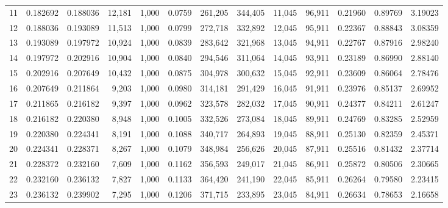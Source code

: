 \begin{tabular}{rrrrrrrrrrrrr}
11  &  0.182692 &  0.188036 &  12,181 &  1,000 &                                     0.0759 &  261,205 &  344,405 &   11,045 &   96,911 &  0.21960 &  0.89769 &  3.19023 \\
12  &  0.188036 &  0.193089 &  11,513 &  1,000 &                                     0.0799 &  272,718 &  332,892 &   12,045 &   95,911 &  0.22367 &  0.88843 &  3.08359 \\
13  &  0.193089 &  0.197972 &  10,924 &  1,000 &                                     0.0839 &  283,642 &  321,968 &   13,045 &   94,911 &  0.22767 &  0.87916 &  2.98240 \\
14  &  0.197972 &  0.202916 &  10,904 &  1,000 &                                     0.0840 &  294,546 &  311,064 &   14,045 &   93,911 &  0.23189 &  0.86990 &  2.88140 \\
15  &  0.202916 &  0.207649 &  10,432 &  1,000 &                                     0.0875 &  304,978 &  300,632 &   15,045 &   92,911 &  0.23609 &  0.86064 &  2.78476 \\
16  &  0.207649 &  0.211864 &   9,203 &  1,000 &                                     0.0980 &  314,181 &  291,429 &   16,045 &   91,911 &  0.23976 &  0.85137 &  2.69952 \\
17  &  0.211865 &  0.216182 &   9,397 &  1,000 &                                     0.0962 &  323,578 &  282,032 &   17,045 &   90,911 &  0.24377 &  0.84211 &  2.61247 \\
18  &  0.216182 &  0.220380 &   8,948 &  1,000 &                                     0.1005 &  332,526 &  273,084 &   18,045 &   89,911 &  0.24769 &  0.83285 &  2.52959 \\
19  &  0.220380 &  0.224341 &   8,191 &  1,000 &                                     0.1088 &  340,717 &  264,893 &   19,045 &   88,911 &  0.25130 &  0.82359 &  2.45371 \\
20  &  0.224341 &  0.228371 &   8,267 &  1,000 &                                     0.1079 &  348,984 &  256,626 &   20,045 &   87,911 &  0.25516 &  0.81432 &  2.37714 \\
21  &  0.228372 &  0.232160 &   7,609 &  1,000 &                                     0.1162 &  356,593 &  249,017 &   21,045 &   86,911 &  0.25872 &  0.80506 &  2.30665 \\
22  &  0.232160 &  0.236132 &   7,827 &  1,000 &                                     0.1133 &  364,420 &  241,190 &   22,045 &   85,911 &  0.26264 &  0.79580 &  2.23415 \\
23  &  0.236132 &  0.239902 &   7,295 &  1,000 &                                     0.1206 &  371,715 &  233,895 &   23,045 &   84,911 &  0.26634 &  0.78653 &  2.16658 \\

\end{tabular}
